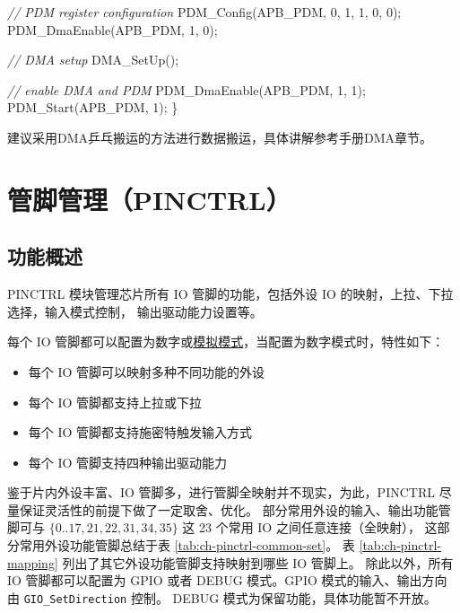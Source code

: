 \documentclass[
  12pt,
]{book}
\newenvironment{Shaded}{\begin{snugshade}}{\end{snugshade}}
\newcommand{\CommentTok}[1]{\textcolor[rgb]{0.56,0.35,0.01}{\textit{#1}}}
\newcommand{\DecValTok}[1]{\textcolor[rgb]{0.00,0.00,0.81}{#1}}
\newcommand{\NormalTok}[1]{#1}
\providecommand{\tightlist}{%
  \setlength{\itemsep}{0pt}\setlength{\parskip}{0pt}}
\begin{document}
\begin{Shaded}
\begin{Highlighting}[]
    \CommentTok{// PDM register configuration}
\NormalTok{    PDM_Config(APB_PDM, }\DecValTok{0}\NormalTok{, }\DecValTok{1}\NormalTok{, }\DecValTok{1}\NormalTok{, }\DecValTok{0}\NormalTok{, }\DecValTok{0}\NormalTok{);    }
\NormalTok{    PDM_DmaEnable(APB_PDM, }\DecValTok{1}\NormalTok{, }\DecValTok{0}\NormalTok{);}
    
    \CommentTok{// DMA setup}
\NormalTok{    DMA_SetUp();}
    
    \CommentTok{// enable DMA and PDM}
\NormalTok{    PDM_DmaEnable(APB_PDM, }\DecValTok{1}\NormalTok{, }\DecValTok{1}\NormalTok{);}
\NormalTok{    PDM_Start(APB_PDM, }\DecValTok{1}\NormalTok{);}
\NormalTok{\}}
\end{Highlighting}
\end{Shaded}

建议采用DMA乒乓搬运的方法进行数据搬运，具体讲解参考手册DMA章节。

\hypertarget{ch-pinctrl}{%
\chapter{管脚管理（PINCTRL）}\label{ch-pinctrl}}

\hypertarget{ux529fux80fdux6982ux8ff0-3}{%
\section{功能概述}\label{ux529fux80fdux6982ux8ff0-3}}

PINCTRL 模块管理芯片所有 IO 管脚的功能，包括外设 IO 的映射，上拉、下拉选择，输入模式控制，
输出驱动能力设置等。

每个 IO 管脚都可以配置为数字或\protect\hyperlink{pinctrl-config-analog}{模拟模式}，当配置为数字模式时，特性如下：

\begin{itemize}
\tightlist
\item
  每个 IO 管脚可以映射多种不同功能的外设
\item
  每个 IO 管脚都支持上拉或下拉
\item
  每个 IO 管脚都支持施密特触发输入方式
\item
  每个 IO 管脚支持四种输出驱动能力
\end{itemize}

鉴于片内外设丰富、IO 管脚多，进行管脚全映射并不现实，为此，PINCTRL 尽量保证灵活性的前提下做了一定取舍、优化。
部分常用外设的输入、输出功能管脚可与 \(\{{0 .. 17, 21, 22, 31, 34, 35\}}\) 这 23 个常用 IO 之间任意连接（全映射），
这部分常用外设功能管脚总结于表 \ref{tab:ch-pinctrl-common-set}。
表 \ref{tab:ch-pinctrl-mapping} 列出了其它外设功能管脚支持映射到哪些 IO 管脚上。
除此以外，所有 IO 管脚都可以配置为 GPIO 或者 DEBUG 模式。GPIO 模式的输入、输出方向由 \texttt{GIO\_SetDirection} 控制。
DEBUG 模式为保留功能，具体功能暂不开放。
\end{document}
